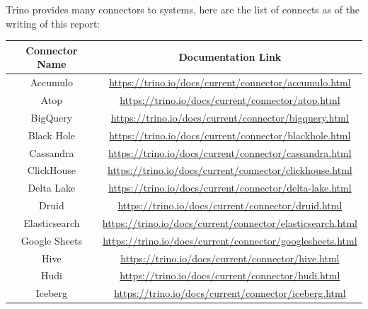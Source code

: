 Trino provides many connectors to systems, here are the list of connects as of the writing of this report:

\begin{table}[ht]
\centering
	\begin{tabular}{|c|c|}
	\hline
	\textbf{Connector Name} & \textbf{Documentation Link} \\ \hline
	Accumulo & \href{https://trino.io/docs/current/connector/accumulo.html}{https://trino.io/docs/current/connector/accumulo.html} \\ \hline
	Atop & \href{https://trino.io/docs/current/connector/atop.html}{https://trino.io/docs/current/connector/atop.html} \\ \hline
	BigQuery & \href{https://trino.io/docs/current/connector/bigquery.html}{https://trino.io/docs/current/connector/bigquery.html} \\ \hline
	Black Hole & \href{https://trino.io/docs/current/connector/blackhole.html}{https://trino.io/docs/current/connector/blackhole.html} \\ \hline
	Cassandra & \href{https://trino.io/docs/current/connector/cassandra.html}{https://trino.io/docs/current/connector/cassandra.html} \\ \hline
	ClickHouse & \href{https://trino.io/docs/current/connector/clickhouse.html}{https://trino.io/docs/current/connector/clickhouse.html} \\ \hline
	Delta Lake & \href{https://trino.io/docs/current/connector/delta-lake.html}{https://trino.io/docs/current/connector/delta-lake.html} \\ \hline
	Druid & \href{https://trino.io/docs/current/connector/druid.html}{https://trino.io/docs/current/connector/druid.html} \\ \hline
	Elasticsearch & \href{https://trino.io/docs/current/connector/elasticsearch.html}{https://trino.io/docs/current/connector/elasticsearch.html} \\ \hline
	Google Sheets & \href{https://trino.io/docs/current/connector/googlesheets.html}{https://trino.io/docs/current/connector/googlesheets.html} \\ \hline
	Hive & \href{https://trino.io/docs/current/connector/hive.html}{https://trino.io/docs/current/connector/hive.html} \\ \hline
	Hudi & \href{https://trino.io/docs/current/connector/hudi.html}{https://trino.io/docs/current/connector/hudi.html} \\ \hline
	Iceberg & \href{https://trino.io/docs/current/connector/iceberg.html}{https://trino.io/docs/current/connector/iceberg.html} \\ \hline

\end{tabular}
\end{table}

